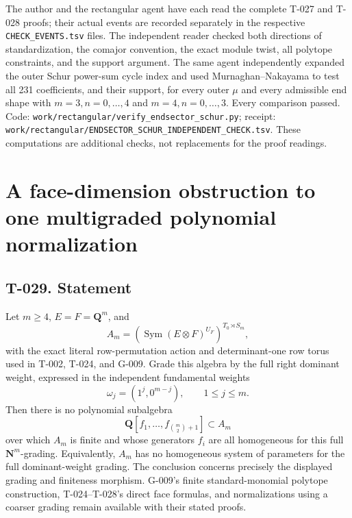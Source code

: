 \documentclass[
  10pt,
]{article}
\begin{document}
The author and the rectangular agent have each read the complete T-027
and T-028 proofs; their actual events are recorded separately in the
respective \texttt{\small CHECK\_\allowbreak{}EVENTS.tsv} files. The
independent reader checked both directions of standardization, the
comajor convention, the exact module twist, all polytope constraints,
and the support argument. The same agent independently expanded the
outer Schur power-sum cycle index and used Murnaghan--Nakayama to test
all 231 coefficients, and their support, for every outer \(\mu\) and
every admissible end shape with \(m=3,n=0,\ldots,4\) and
\(m=4,n=0,\ldots,3\). Every comparison passed. Code:
\texttt{\small work/\allowbreak{}rectangular/\allowbreak{}verify\_\allowbreak{}endsector\_\allowbreak{}schur.py};
receipt:
\texttt{\small work/\allowbreak{}rectangular/\allowbreak{}ENDSECTOR\_\allowbreak{}SCHUR\_\allowbreak{}INDEPENDENT\_\allowbreak{}CHECK.tsv}.
These computations are additional checks, not replacements for the proof
readings.

\section{A face-dimension obstruction to one multigraded polynomial
normalization}\label{a-face-dimension-obstruction-to-one-multigraded-polynomial-normalization}

\subsection{T-029. Statement}\label{t-029.-statement}

Let \(m\ge4\), \(E=F=\mathbf Q^m\), and \[
A_m=\left(\operatorname{Sym}(E\otimes F)^{U_F}\right)^{T_0\rtimes S_m},
\tag{N.1}
\] with the exact literal row-permutation action and determinant-one row
torus used in T-002, T-024, and G-009. Grade this algebra by the full
right dominant weight, expressed in the independent fundamental weights
\[
\omega_j=(1^j,0^{m-j}),\qquad 1\le j\le m.
\] Then there is no polynomial subalgebra \[
\mathbf Q[f_1,\ldots,f_{\binom m2+1}]\subset A_m
\tag{N.2}
\] over which \(A_m\) is finite and whose generators \(f_i\) are all
homogeneous for this full \(\mathbf N^m\)-grading. Equivalently, \(A_m\)
has no homogeneous system of parameters for the full dominant-weight
grading. The conclusion concerns precisely the displayed grading and
finiteness morphism. G-009's finite standard-monomial polytope
construction, T-024--T-028's direct face formulas, and normalizations
using a coarser grading remain available with their stated proofs.
\end{document}
